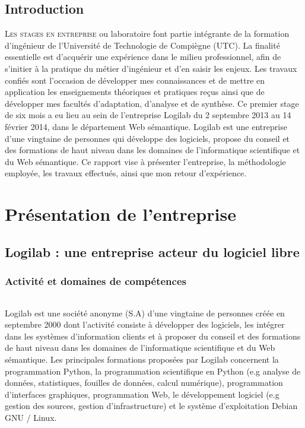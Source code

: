 \documentclass {report}
\begin{document}
\clearpage
\begin{flushright}
\begin{minipage}[c]{7cm}
\chapter*{Introduction}
    \lettrine{L}{es stages en entreprise} ou laboratoire font partie intégrante de la formation d’ingénieur de l’Université de Technologie de Compiègne (UTC). La finalité essentielle est d'acquérir une expérience dans le milieu professionnel, afin de s'initier à la pratique du métier d’ingénieur et d'en saisir les enjeux. Les travaux confiés sont l’occasion de développer mes connaissances et de mettre en application les enseignements théoriques et pratiques reçus ainsi que de développer mes facultés d’adaptation, d’analyse et de synthèse. Ce premier stage de six mois a eu lieu au sein de l’entreprise Logilab du 2 septembre 2013 au 14 février 2014, dans le département Web sémantique. Logilab est une entreprise d'une vingtaine de personnes qui développe des logiciels, propose du conseil et des formations de haut niveau dans les domaines de l’informatique scientifique et du Web sémantique. Ce rapport vise à présenter l'entreprise, la méthodologie employée, les travaux effectués, ainsi que mon retour d'expérience.
\end{minipage}
\end{flushright}
\pagestyle{headings}


\part{Présentation de l'entreprise}

\chapter{Logilab : une entreprise acteur du logiciel libre}
\section{Activité et domaines de compétences}
\paragraph{}
Logilab est une société anonyme (S.A) d'une vingtaine de personnes créée en septembre 2000 dont l'activité consiste à développer des logiciels, les intégrer dans les systèmes d'information clients et à proposer du conseil et des formations de haut niveau dans les domaines de l'informatique scientifique et du Web sémantique\footnotemark[1]. Les principales formations proposées par Logilab concernent la programmation Python, la programmation scientifique en Python (e.g analyse de données, statistiques, fouilles de données, calcul numérique), programmation d'interfaces graphiques, programmation Web, le développement logiciel (e.g gestion des sources, gestion d'infrastructure) et le système d'exploitation Debian GNU / Linux.
\end{document}
